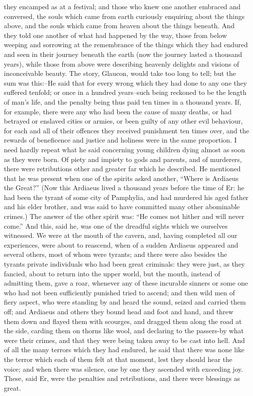 they encamped as at a festival; and those who knew one another embraced
and conversed, the souls which came from earth curiously enquiring about
the things above, and the souls which came from heaven about the things
beneath. And they told one another of what had happened by the way,
those from below weeping and sorrowing at the remembrance of the things
which they had endured and seen in their journey beneath the earth
(now the journey lasted a thousand years), while those from above were
describing heavenly delights and visions of inconceivable beauty. The
story, Glaucon, would take too long to tell; but the sum was this:--He
said that for every wrong which they had done to any one they suffered
tenfold; or once in a hundred years--such being reckoned to be the
length of man's life, and the penalty being thus paid ten times in a
thousand years. If, for example, there were any who had been the cause
of many deaths, or had betrayed or enslaved cities or armies, or been
guilty of any other evil behaviour, for each and all of their offences
they received punishment ten times over, and the rewards of beneficence
and justice and holiness were in the same proportion. I need hardly
repeat what he said concerning young children dying almost as soon
as they were born. Of piety and impiety to gods and parents, and of
murderers, there were retributions other and greater far which he
described. He mentioned that he was present when one of the spirits
asked another, ``Where is Ardiaeus the Great?'' (Now this Ardiaeus lived
a thousand years before the time of Er: he had been the tyrant of
some city of Pamphylia, and had murdered his aged father and his elder
brother, and was said to have committed many other abominable crimes.)
The answer of the other spirit was: ``He comes not hither and will never
come.'' And this, said he, was one of the dreadful sights which we
ourselves witnessed. We were at the mouth of the cavern, and, having
completed all our experiences, were about to reascend, when of a sudden
Ardiaeus appeared and several others, most of whom were tyrants; and
there were also besides the tyrants private individuals who had been
great criminals: they were just, as they fancied, about to return into
the upper world, but the mouth, instead of admitting them, gave a roar,
whenever any of these incurable sinners or some one who had not been
sufficiently punished tried to ascend; and then wild men of fiery
aspect, who were standing by and heard the sound, seized and carried
them off; and Ardiaeus and others they bound head and foot and hand, and
threw them down and flayed them with scourges, and dragged them along
the road at the side, carding them on thorns like wool, and declaring
to the passers-by what were their crimes, and that they were being taken
away to be cast into hell. And of all the many terrors which they had
endured, he said that there was none like the terror which each of them
felt at that moment, lest they should hear the voice; and when there was
silence, one by one they ascended with exceeding joy. These, said Er,
were the penalties and retributions, and there were blessings as great.

